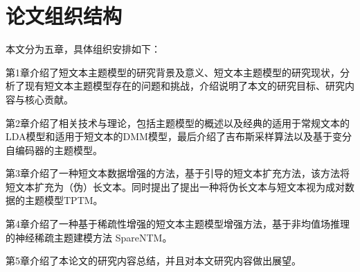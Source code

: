 \section{论文组织结构}
本文分为五章，具体组织安排如下：

第1章介绍了短文本主题模型的研究背景及意义、短文本主题模型的研究现状，分析了现有短文本主题模型存在的问题和挑战，介绍说明了本文的研究目标、研究内容与核心贡献。

第2章介绍了相关技术与理论，包括主题模型的概述以及经典的适用于常规文本的LDA模型和适用于短文本的DMM模型，最后介绍了吉布斯采样算法以及基于变分自编码器的主题模型。

第3章介绍了一种短文本数据增强的方法，基于引导的短文本扩充方法，该方法将短文本扩充为（伪）长文本。同时提出了提出一种将伪长文本与短文本视为成对数据的主题模型TPTM。

第4章介绍了一种基于稀疏性增强的短文本主题模型增强方法，基于非均值场推理的神经稀疏主题建模方法 SpareNTM。

第5章介绍了本论文的研究内容总结，并且对本文研究内容做出展望。
